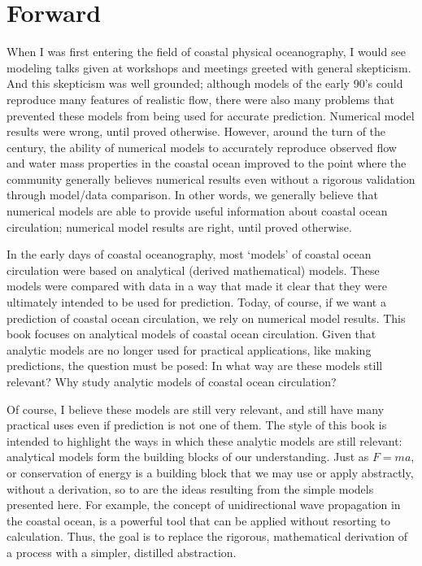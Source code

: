 \documentclass[11pt]{report}
\numberwithin{equation}{section}
\begin{document}
\section*{Forward}

When I was first entering the field of coastal physical oceanography, I would see modeling talks given at workshops and meetings greeted with general skepticism.  And this skepticism was well grounded; although models of the early 90's could reproduce many features of realistic flow, there were also many problems that prevented these models from being used for accurate prediction.  Numerical model results were wrong, until proved otherwise.  However, around the turn of the century, the ability of numerical models to accurately reproduce observed flow and water mass properties in the coastal ocean improved to the point where the community generally believes numerical results even without a rigorous validation through model/data comparison.  In other words, we generally believe that numerical models are able to provide useful information about coastal ocean circulation; numerical model results are right, until proved otherwise.

In the early days of coastal oceanography, most `models' of coastal ocean circulation were based on analytical (derived mathematical) models.  These models were compared with data in a way that made it clear that they were ultimately intended to be used for prediction.  Today, of course, if we want a prediction of coastal ocean circulation, we rely on numerical model results.  This book focuses on analytical models of coastal ocean circulation.  Given that analytic models are no longer used for practical applications, like making predictions, the question must be posed:  In what way are these models still relevant?  Why study analytic models of coastal ocean circulation?

Of course, I believe these models are still very relevant, and still have many practical uses even if prediction is not one of them.  The style of this book is intended to highlight the ways in which these analytic models are still relevant:  analytical models form the building blocks of our understanding.  Just as $F=ma$, or conservation of energy is a building block that we may use or apply abstractly, without a derivation, so to are the ideas resulting from the simple models presented here.  For example, the concept of unidirectional wave propagation in the coastal ocean, is a powerful tool that can be applied without resorting to calculation.  Thus, the goal is to replace the rigorous, mathematical derivation of a process with a simpler, distilled abstraction.
\end{document}
